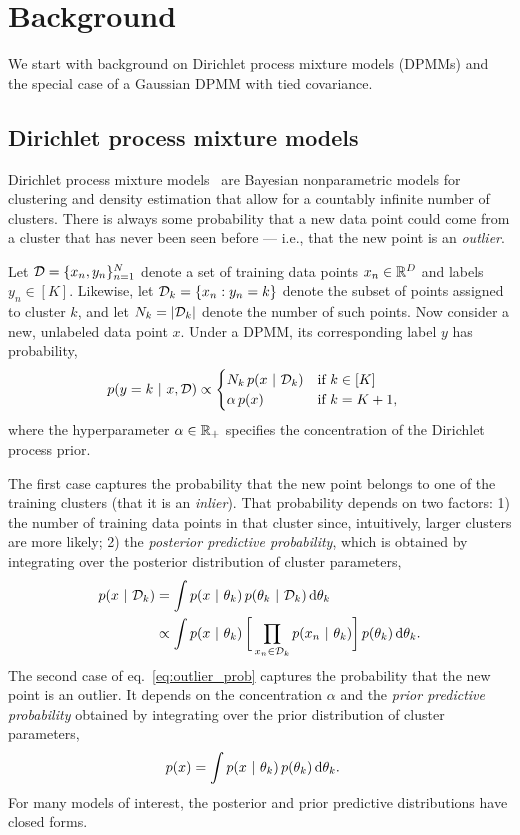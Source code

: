 \section{Background}
\label{sec:background}
We start with background on Dirichlet process mixture models (DPMMs) and the special case of a Gaussian DPMM with tied covariance.

\subsection{Dirichlet process mixture models}
\label{sec:dpmm}

Dirichlet process mixture models~\citep{lo1984class} are Bayesian nonparametric models for clustering and density estimation that allow for a countably infinite number of clusters.
There is always some probability that a new data point could come from a cluster that has never been seen before --- i.e., that the new point is an \textit{outlier}.

Let $\mathcal{D} = \{x_n, y_n\}_{n=1}^N$ denote a set of training data points $x_n \in \mathbb{R}^D$ and labels $y_n \in [K]$.
Likewise, let $\mathcal{D}_k = \{x_n: y_n=k\}$ denote the subset of points assigned to cluster $k$, and let $N_k = |\mathcal{D}_k|$ denote the number of such points.
Now consider a new, unlabeled data point $x$. Under a DPMM, its corresponding label $y$ has probability,
\begin{align}
    \label{eq:outlier_prob}
    p(y = k ~\vert~ x, \mathcal{D})
    &\propto
    \begin{cases}
    N_k \, p(x ~\vert~ \mathcal{D}_k) &\text{if } k\in[K] \\
    \alpha \, p(x) &\text{if } k = K+1,
    \end{cases}
\end{align}
where the hyperparameter $\alpha \in \mathbb{R}_+$ specifies the concentration of the Dirichlet process prior.

The first case captures the probability that the new point belongs to one of the training clusters (that it is an \textit{inlier}).
That probability depends on two factors:
1) the number of training data points in that cluster since, intuitively, larger clusters are more likely;
2) the \textit{posterior predictive probability}, which is obtained by integrating over the posterior distribution of cluster parameters,
\begin{align}
    p(x ~\vert~ \mathcal{D}_k)
    &= \int p(x ~\vert~ \theta_k) \, p(\theta_k ~\vert~ \mathcal{D}_k) \mathop{}\!\mathrm{d} \theta_k \\
    \nonumber
    &\propto \int p(x ~\vert~ \theta_k) \, \bigg[\prod_{x_n \in \mathcal{D}_k} p(x_n ~\vert~ \theta_k) \bigg] \, p(\theta_k) \mathop{}\!\mathrm{d} \theta_k.
\end{align}
The second case of eq.~\eqref{eq:outlier_prob} captures the probability that the new point is an outlier.
It depends on the concentration $\alpha$ and the \textit{prior predictive probability} obtained by integrating over the prior distribution of cluster parameters,
\begin{align}
    p(x) &= \int p(x ~\vert~ \theta_k) \, p(\theta_k) \mathop{}\!\mathrm{d} \theta_k.
\end{align}
For many models of interest, the posterior and prior predictive distributions have closed forms.

